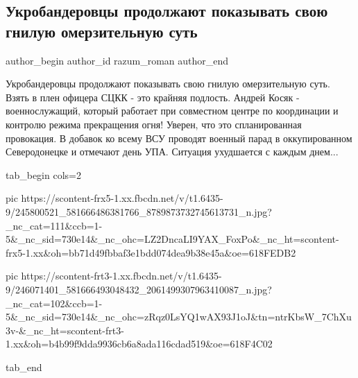  
 
 
 
 
 
\subsection{Укробандеровцы продолжают показывать свою гнилую омерзительную суть}
\label{sec:15_10_2021.fb.razum_roman.1.sckk_oficer_plen_ukraina}
 
\ifcmt
 author_begin
   author_id razum_roman
 author_end
\fi

Укробандеровцы продолжают показывать свою гнилую омерзительную суть. Взять в
плен офицера СЦКК - это крайняя подлость. Андрей Косяк - военнослужащий,
который работает при совместном центре по координации и контролю режима
прекращения огня! Уверен, что это спланированная провокация. В добавок ко всему
ВСУ проводят военный парад в оккупированном Северодонецке и отмечают день УПА.
Ситуация ухудшается с каждым днем...

\ifcmt
  tab_begin cols=2

     pic https://scontent-frx5-1.xx.fbcdn.net/v/t1.6435-9/245800521_581666486381766_8789873732745613731_n.jpg?_nc_cat=111&ccb=1-5&_nc_sid=730e14&_nc_ohc=LZ2DncaLI9YAX_FoxPo&_nc_ht=scontent-frx5-1.xx&oh=bb71d49fbbaf3e1bdd074dea9b38e45a&oe=618FEDB2

     pic https://scontent-frt3-1.xx.fbcdn.net/v/t1.6435-9/246071401_581666493048432_2061499307963410087_n.jpg?_nc_cat=102&ccb=1-5&_nc_sid=730e14&_nc_ohc=zRqz0LsYQ1wAX93J1oJ&tn=ntrKbsW_7ChXu3v-&_nc_ht=scontent-frt3-1.xx&oh=b4b99f9dda9936cb6a8ada116cdad519&oe=618F4C02

  tab_end
\fi
